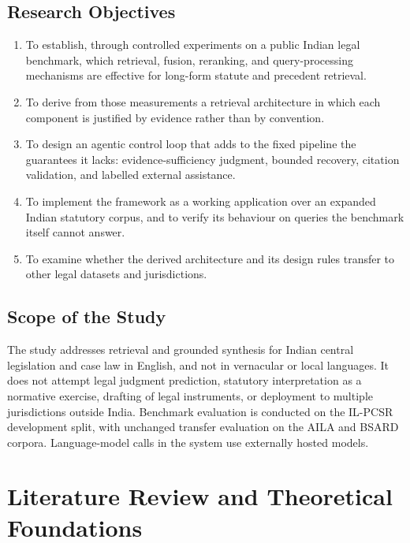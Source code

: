 \documentclass{mnnit}
\begin{document}
\section{Research Objectives}
\begin{enumerate}
\item To establish, through controlled experiments on a public
  Indian legal benchmark, which retrieval, fusion, reranking, and
  query-processing mechanisms are effective for long-form statute
  and precedent retrieval.
\item To derive from those measurements a retrieval architecture
  in which each component is justified by evidence rather than by
  convention.
\item To design an agentic control loop that adds to the fixed
  pipeline the guarantees it lacks: evidence-sufficiency
  judgment, bounded recovery, citation validation, and labelled
  external assistance.
\item To implement the framework as a working application over an
  expanded Indian statutory corpus, and to verify its behaviour
  on queries the benchmark itself cannot answer.
\item To examine whether the derived architecture and its design
  rules transfer to other legal datasets and jurisdictions.
\end{enumerate}

\section{Scope of the Study}
The study addresses retrieval and grounded synthesis for Indian
central legislation and case law in English, and not in
vernacular or local languages. It does not attempt legal
judgment prediction, statutory interpretation as a normative
exercise, drafting of legal instruments, or deployment to
multiple jurisdictions outside India. Benchmark evaluation is
conducted on the IL-PCSR development split, with unchanged
transfer evaluation on the AILA and BSARD corpora.
Language-model calls in the system use externally hosted models.

\chapter{Literature Review and Theoretical Foundations}
\end{document}

